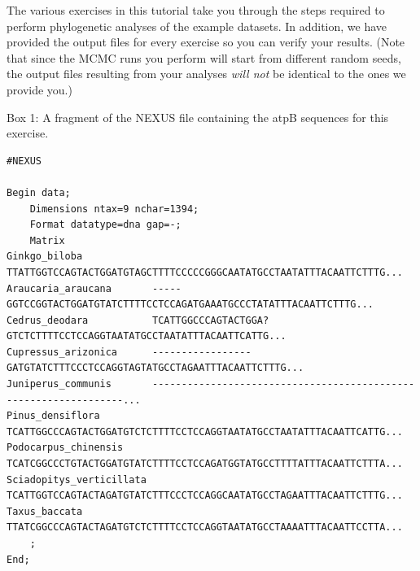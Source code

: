 The various exercises in this tutorial take you through the steps required to perform phylogenetic analyses of the example datasets. 
In addition, we have provided the output files for every exercise so you can verify your results. (Note that since the MCMC runs you perform will start from different random seeds, the output files resulting from your analyses \textit{will not} be identical to the ones we provide you.)





\begin{center}
Box 1: A fragment of the NEXUS file containing the atpB sequences for this exercise. \\
\end{center}
{\tt \scriptsize \begin{framed}
\begin{lstlisting}
#NEXUS 

Begin data;
	Dimensions ntax=9 nchar=1394;
	Format datatype=dna gap=-;
	Matrix
Ginkgo_biloba            TTATTGGTCCAGTACTGGATGTAGCTTTTCCCCCGGGCAATATGCCTAATATTTACAATTCTTTG...
Araucaria_araucana       -----GGTCCGGTACTGGATGTATCTTTTCCTCCAGATGAAATGCCCTATATTTACAATTCTTTG...
Cedrus_deodara           TCATTGGCCCAGTACTGGA?GTCTCTTTTCCTCCAGGTAATATGCCTAATATTTACAATTCATTG...
Cupressus_arizonica      -----------------GATGTATCTTTCCCTCCAGGTAGTATGCCTAGAATTTACAATTCTTTG...
Juniperus_communis       -----------------------------------------------------------------...
Pinus_densiflora         TCATTGGCCCAGTACTGGATGTCTCTTTTCCTCCAGGTAATATGCCTAATATTTACAATTCATTG...
Podocarpus_chinensis     TCATCGGCCCTGTACTGGATGTATCTTTTCCTCCAGATGGTATGCCTTTTATTTACAATTCTTTA...
Sciadopitys_verticillata TCATTGGTCCAGTACTAGATGTATCTTTCCCTCCAGGCAATATGCCTAGAATTTACAATTCTTTG...
Taxus_baccata            TTATCGGCCCAGTACTAGATGTCTCTTTTCCTCCAGGTAATATGCCTAAAATTTACAATTCCTTA...
	;
End;
\end{lstlisting}
\end{framed}}



